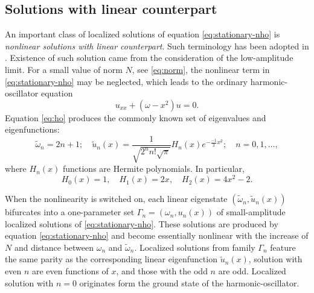 \subsection{Solutions with linear counterpart}

An important class of localized solutions of equation \eqref{eq:stationary-nho} is {\it nonlinear solutions with linear counterpart}.
Such terminology has been adopted in \cite{AgostaMalomedPresilla, AgostaPresilla}.
Existence of such solution came from the consideration of the low-amplitude limit.
For a small value of norm $N$, see \eqref{eq:norm}, the nonlinear term in \eqref{eq:stationary-nho} may be neglected, which leads to the ordinary harmonic-oscillator equation
\begin{equation}
	u_{xx} + (\omega - x^2) u = 0.
\label{eq:ho}
\end{equation}
Equation \eqref{eq:ho} produces the commonly known set of eigenvalues and eigenfunctions:
\begin{equation}
	\tilde{\omega}_n = 2n + 1; \quad \tilde{u}_n(x) = \dfrac{1}{\sqrt{2^n n! \sqrt{\pi}}} H_n(x) e^{-\frac{-1}{2} x^2}; \quad n = 0, 1, \dots,
\label{eq:ho-solutions}
\end{equation}
where $H_n(x)$ functions are Hermite polynomials.
In particular,
\begin{equation*}
	H_0(x) = 1, \quad H_1(x) = 2x, \quad H_2(x) = 4x^2 - 2.	
\end{equation*}

When the nonlinearity is switched on, each linear eigenstate $(\tilde{\omega}_n, \tilde{u}_n(x))$ bifurcates into a one-parameter set $\Gamma_n = (\omega_n, u_n(x))$ of small-amplitude localized solutions of \eqref{eq:stationary-nho}.
These solutions are produced by equation \eqref{eq:stationary-nho} and become essentially nonlinear with the increase of $N$ and distance between $\omega_n$ and $\tilde{\omega}_n$.
Localized solutions from family $\Gamma_n$ feature the same parity as the corresponding linear eigenfunction $\tilde{u}_n(x)$, solution with even $n$ are even functions of $x$, and those with the odd $n$ are odd.
Localized solution with $n = 0$ originates form the ground state of the harmonic-oscillator.

